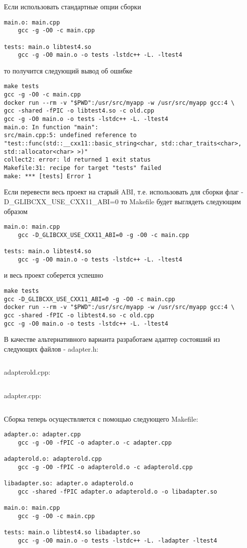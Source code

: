 \documentclass[14pt,a4paper]{article}
\begin{document}
Если использовать стандартные опции сборки
\begin{verbatim}
main.o: main.cpp
	gcc -g -O0 -c main.cpp 

tests: main.o libtest4.so
	gcc -g -O0 main.o -o tests -lstdc++ -L. -ltest4
\end{verbatim}
то получится следующий вывод об ошибке
\begin{verbatim}
make tests
gcc -g -O0 -c main.cpp 
docker run --rm -v "$PWD":/usr/src/myapp -w /usr/src/myapp gcc:4 \
gcc -shared -fPIC -o libtest4.so -c old.cpp
gcc -g -O0 main.o -o tests -lstdc++ -L. -ltest4
main.o: In function "main":
src/main.cpp:5: undefined reference to 
"test::func(std::__cxx11::basic_string<char, std::char_traits<char>, 
std::allocator<char> >)"
collect2: error: ld returned 1 exit status
Makefile:31: recipe for target "tests" failed
make: *** [tests] Error 1
\end{verbatim}


Если перевести весь проект на старый ABI, т.е. использовать для сборки
флаг -D\_GLIBCXX\_USE\_CXX11\_ABI=0 то Makefile будет выглядеть
следующим образом
\begin{verbatim}
main.o: main.cpp
	gcc -D_GLIBCXX_USE_CXX11_ABI=0 -g -O0 -c main.cpp

tests: main.o libtest4.so
	gcc -g -O0 main.o -o tests -lstdc++ -L. -ltest4
\end{verbatim}
и весь проект соберется успешно
\begin{verbatim}
make tests
gcc -D_GLIBCXX_USE_CXX11_ABI=0 -g -O0 -c main.cpp 
docker run --rm -v "$PWD":/usr/src/myapp -w /usr/src/myapp gcc:4 \
gcc -shared -fPIC -o libtest4.so -c old.cpp
gcc -g -O0 main.o -o tests -lstdc++ -L. -ltest4
\end{verbatim}

В качестве альтернативного варианта разработаем адаптер состояший из
следующих файлов - adapter.h:
\inputminted{c++}{./src/adapter.h}
adapterold.cpp:
\inputminted{c++}{./src/adapterold.cpp}
adapter.cpp:
\inputminted{c++}{./src/adapter.cpp}

Сборка теперь осуществляется с помощью следующего Makefile:
\begin{verbatim}
adapter.o: adapter.cpp
	gcc -g -O0 -fPIC -o adapter.o -c adapter.cpp

adapterold.o: adapterold.cpp
	gcc -g -O0 -fPIC -o adapterold.o -c adapterold.cpp

libadapter.so: adapter.o adapterold.o
	gcc -shared -fPIC adapter.o adapterold.o -o libadapter.so 

main.o: main.cpp
	gcc -g -O0 -c main.cpp 

tests: main.o libtest4.so libadapter.so
	gcc -g -O0 main.o -o tests -lstdc++ -L. -ladapter -ltest4
\end{verbatim}
\end{document}
